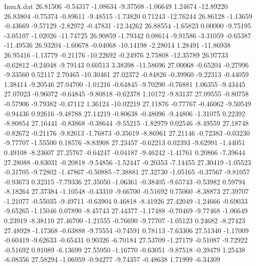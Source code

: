 \begin{filecontents}{ImuA.dat}
  26.81506   -0.54317   -1.08634   -9.37508   -1.06649    1.24674  -12.89220
  26.83804   -0.75374   -0.89611   -9.48515   -1.73820    0.71243  -12.76244
  26.86128   -1.13659   -0.43669   -9.57129   -2.82972   -0.47831  -12.34262
  26.88554   -1.65823    0.00000   -9.75195   -3.05107   -1.02026  -11.74725
  26.90859   -1.79342    0.08614   -9.91586   -3.31059   -0.65387  -11.49536
  26.93204   -1.60678   -0.04068  -10.14198   -2.28014    1.28491  -11.86938
  26.95416   -1.13779   -0.21176  -10.22692   -0.24976    2.75808  -12.35789
  26.97733   -0.62812   -0.24048   -9.79143    0.60513    3.38398  -11.58696
  27.00068   -0.65204   -0.27996   -9.33560    0.52117    2.70465  -10.30461
  27.02372   -0.84826   -0.39960   -9.22313   -0.44059    1.38414   -9.20546
  27.04700   -1.01216   -0.64845   -9.70290   -0.76881    1.06355   -9.43445
  27.07023   -0.96072   -0.64845   -9.80818   -0.62378    1.10172   -9.83137
  27.09555   -0.80758   -0.57906   -9.79382   -0.47112    1.36124  -10.02219
  27.11876   -0.77767   -0.46062   -9.50549   -0.94436    0.92616   -9.48788
  27.14219   -0.80638   -0.48096   -9.44806   -1.31075    0.22392   -8.80854
  27.16441   -0.83868   -0.38644   -9.55215   -1.82979    0.02546   -8.49559
  27.18748   -0.82672   -0.21176   -9.82613   -1.76873   -0.35619   -8.86961
  27.21146   -0.72383   -0.03230   -9.77707   -1.55500    0.18576   -8.83908
  27.23457   -0.62213    0.02393   -9.62991   -1.44051    0.49108   -8.23607
  27.25767   -0.64247   -0.04187   -9.46242   -1.41761    0.20866   -7.39644
  27.28088   -0.83031   -0.20818   -9.54856   -1.52447   -0.20353   -7.14455
  27.30419   -1.05523   -0.31705   -9.72802   -1.47867   -0.50885   -7.38881
  27.32730   -1.05165   -0.37567   -9.81057   -0.93673    0.32315   -7.79336
  27.35050   -1.06361   -0.38405   -9.65743   -0.53982    0.59794   -8.18264
  27.37384   -1.10548   -0.43310   -9.66700   -0.51692    0.75060   -8.38873
  27.39707   -1.21077   -0.55035   -9.49711   -0.63904    0.46818   -8.41926
  27.42049   -1.24666   -0.69033   -9.65265   -1.15046    0.07890   -8.45743
  27.44377   -1.17488   -0.70469   -9.77468   -1.06649    0.23919   -8.38110
  27.46700   -1.21555   -0.76690   -9.77707   -1.05123    0.24682   -8.27423
  27.48928   -1.17368   -0.63888   -9.75554   -0.74591    0.78113   -7.63306
  27.51340   -1.17009   -0.60419   -9.62633   -0.65431    0.90326   -6.70184
  27.53709   -1.27179   -0.51087   -9.72922   -0.51692    0.91089   -6.13699
  27.55950   -1.16770   -0.63051   -9.87518   -0.39479    1.25438   -6.08356
  27.58294   -1.06959   -0.94277   -9.74357   -0.48638    1.71999   -6.34309

\end{filecontents}
